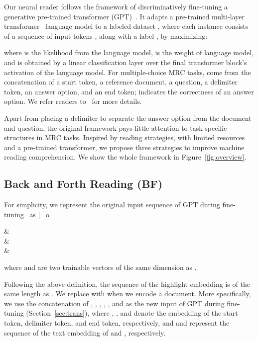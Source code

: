\documentclass[11pt,a4paper]{article}
\begin{document}
Our neural reader follows the framework of discriminatively fine-tuning a generative pre-trained transformer (GPT)~\cite{radfordimproving}. It adapts a pre-trained multi-layer transformer~\cite{vaswani2017attention,liu2018generating} language model to a labeled dataset , where each instance consists of a sequence of input tokens , along with a label , by maximizing:

where  is the likelihood from the language model,  is the weight of language model, and  is obtained by a linear classification layer over the final transformer block's activation of the language model. For multiple-choice MRC tasks,  come from the concatenation of a start token, a reference document, a question, a delimiter token, an answer option, and an end token;  indicates the correctness of an answer option. We refer readers to~ for more details.



Apart from placing a delimiter to separate the answer option from the document and question, the original framework pays little attention to task-specific structures in MRC tasks. Inspired by reading strategies, with limited resources and a pre-trained transformer, we propose three strategies to improve machine reading comprehension. We show the whole framework in Figure~\ref{fig:overview}. 










 \subsection{Back and Forth Reading (BF)}
\label{sec:fb}



For simplicity, we represent the original input sequence of GPT during fine-tuning~\cite{radfordimproving} as [ \, o\
\small
{} =
\begin{cases}
 \bm{\ell^{+}} &   \\
 & \\
 \bm{\ell^{-}} &
\end{cases} 
\label{eq:hi}

\noindent where  and  are two trainable vectors of the same dimension as .

Following the above definition, the sequence of the highlight embedding  is of the same length as . We replace  with  when we encode a document. More specifically, we use the concatenation of , , , , , and  as the new input of GPT during fine-tuning (Section~\ref{sec:trans}), where , , and  denote the embedding of the start token, delimiter token, and end token, respectively, and  and  represent the sequence of the text embedding of  and , respectively.
\end{document}
